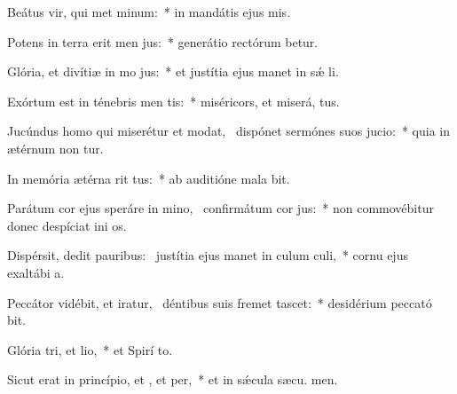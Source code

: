 \item Beátus vir, qui met minum:~* in mandátis ejus  mis.
\item Potens in terra erit men jus:~* generátio rectórum betur.
\item Glória, et divítiæ in mo jus:~* et justítia ejus manet in sǽ li.
\item Exórtum est in ténebris men tis:~* miséricors, et miserá,  tus.
\item Jucúndus homo qui miserétur et modat,~\pscross{} dispónet sermónes suos  jucio:~* quia in ætérnum non tur.
\item In memória ætérna rit tus:~* ab auditióne mala  bit.
\item Parátum cor ejus speráre in mino,~\pscross{} confirmátum  cor jus:~* non commovébitur donec despíciat ini os.
\item Dispérsit, dedit pauribus:~\pscross{} justítia ejus manet in culum culi,~* cornu ejus exaltábi  a.
\item Peccátor vidébit, et iratur,~\pscross{} déntibus suis fremet  tascet:~* desidérium peccató bit.
\item Glória tri, et lio,~* et Spirí to.
\item Sicut erat in princípio, et , et per,~* et in sǽcula sæcu. men.
